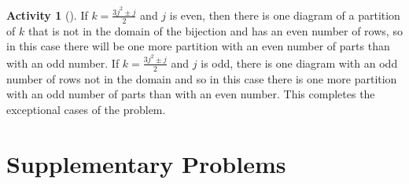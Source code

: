 \documentclass[10pt,]{book}
\theoremstyle{plain}
\theoremstyle{definition}
\newtheorem{activity}[project]{Activity}
\numberwithin{equation}{chapter}
\begin{document}
\begin{activity}[]
\par
If \(k= \frac{3j^2\pm j}{2}\) and \(j\) is even, then there is one diagram of a partition of \(k\) that is not in the domain of the bijection and has an even number of rows, so in this case there will be one more partition with an even number of parts than with an odd number. If \(k= \frac{3j^2\pm j}{2}\) and \(j\) is odd, there is one diagram with an odd number of rows not in the domain and so in this case there is one more partition with an odd number of parts than with an even number. This completes the exceptional cases of the problem.%
\end{activity}
\typeout{************************************************}
\typeout{************************************************}
\section[{Supplementary Problems}]{Supplementary Problems}\label{section-12}
\leavevmode%
\end{document}
